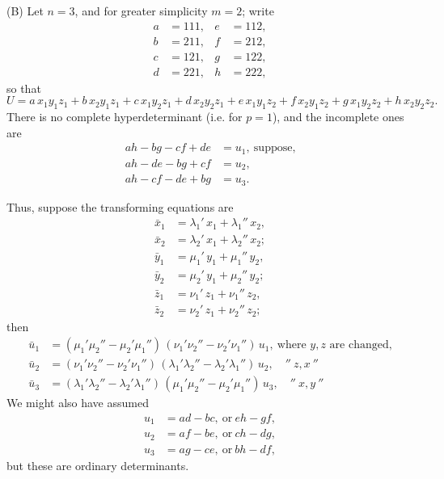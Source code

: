 \documentclass[11pt]{article}
\begin{document}
(B) Let $n=3$, and for greater simplicity $m=2$; write
\[
\begin{aligned}
a &= 111, & e &= 112,\\
b &= 211, & f &= 212,\\
c &= 121, & g &= 122,\\
d &= 221, & h &= 222,
\end{aligned}
\]
so that
\[
U = a\,x_1 y_1 z_1 + b\,x_2 y_1 z_1 + c\,x_1 y_2 z_1 + d\,x_2 y_2 z_1 + e\,x_1 y_1 z_2 + f\,x_2 y_1 z_2 + g\,x_1 y_2 z_2 + h\,x_2 y_2 z_2.
\]
There is no complete hyperdeterminant (i.e. for $p=1$), and the incomplete ones are
\[
\begin{aligned}
ah - bg - cf + de &= u_1,\ \text{suppose,}\\
ah - de - bg + cf &= u_2,\\
ah - cf - de + bg &= u_3.
\end{aligned}
\]

Thus, suppose the transforming equations are
\[
\begin{aligned}
\bar{x}_1 &= \lambda_1{}'\,x_1 + \lambda_1{}''\,x_2,\\
\bar{x}_2 &= \lambda_2{}'\,x_1 + \lambda_2{}''\,x_2;\\
\bar{y}_1 &= \mu_1{}'\,y_1 + \mu_1{}''\,y_2,\\
\bar{y}_2 &= \mu_2{}'\,y_1 + \mu_2{}''\,y_2;\\
\bar{z}_1 &= \nu_1{}'\,z_1 + \nu_1{}''\,z_2,\\
\bar{z}_2 &= \nu_2{}'\,z_1 + \nu_2{}''\,z_2;
\end{aligned}
\]
then
\[
\begin{aligned}
\bar{u}_1 &= (\mu_1'\mu_2'' - \mu_2'\mu_1'')\,(\nu_1'\nu_2'' - \nu_2'\nu_1'')\,u_1,\ \text{where } y, z \text{ are changed,}\\
\bar{u}_2 &= (\nu_1'\nu_2'' - \nu_2'\nu_1'')\,(\lambda_1'\lambda_2'' - \lambda_2'\lambda_1'')\,u_2,\quad ''\ z, x\ ''\\
\bar{u}_3 &= (\lambda_1'\lambda_2'' - \lambda_2'\lambda_1'')\,(\mu_1'\mu_2'' - \mu_2'\mu_1'')\,u_3,\quad ''\ x, y\ ''
\end{aligned}
\]
We might also have assumed
\[
\begin{aligned}
u_1 &= ad - bc,\ \text{or}\ eh - gf,\\
u_2 &= af - be,\ \text{or}\ ch - dg,\\
u_3 &= ag - ce,\ \text{or}\ bh - df,
\end{aligned}
\]
but these are ordinary determinants.
\end{document}
